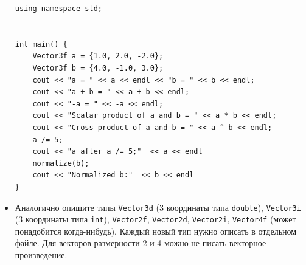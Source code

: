 \documentclass{article}
\begin{document}
\begin{itemize}
\begin{lstlisting}
using namespace std;


int main() {
	Vector3f a = {1.0, 2.0, -2.0};
	Vector3f b = {4.0, -1.0, 3.0};
	cout << "a = " << a << endl << "b = " << b << endl;
	cout << "a + b = " << a + b << endl;
	cout << "-a = " << -a << endl;
	cout << "Scalar product of a and b = " << a * b << endl;
	cout << "Cross product of a and b = " << a ^ b << endl;
	a /= 5;
	cout << "a after a /= 5;"  << a << endl
	normalize(b);
	cout << "Normalized b:"  << b << endl
}
\end{lstlisting}
\item Аналогично опишите типы \texttt{Vector3d} (3 координаты типа \texttt{double}), \texttt{Vector3i} (3 координаты типа \texttt{int}), \texttt{Vector2f}, \texttt{Vector2d}, \texttt{Vector2i}, \texttt{Vector4f} (может понадобится когда-нибудь). Каждый новый тип нужно описать в отдельном файле. Для векторов размерности 2 и 4 можно не писать векторное произведение.

\end{itemize}
\end{document}
